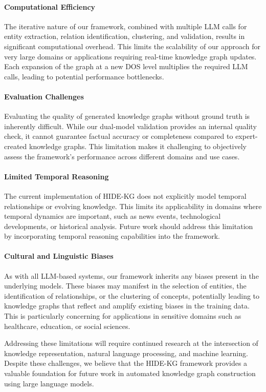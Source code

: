 \documentclass[11pt]{article}
\begin{document}
\paragraph{Computational Efficiency} The iterative nature of our framework, combined with multiple LLM calls for entity extraction, relation identification, clustering, and validation, results in significant computational overhead. This limits the scalability of our approach for very large domains or applications requiring real-time knowledge graph updates. Each expansion of the graph at a new DOS level multiplies the required LLM calls, leading to potential performance bottlenecks.

\paragraph{Evaluation Challenges} Evaluating the quality of generated knowledge graphs without ground truth is inherently difficult. While our dual-model validation provides an internal quality check, it cannot guarantee factual accuracy or completeness compared to expert-created knowledge graphs. This limitation makes it challenging to objectively assess the framework's performance across different domains and use cases.

\paragraph{Limited Temporal Reasoning} The current implementation of HIDE-KG does not explicitly model temporal relationships or evolving knowledge. This limits its applicability in domains where temporal dynamics are important, such as news events, technological developments, or historical analysis. Future work should address this limitation by incorporating temporal reasoning capabilities into the framework.

\paragraph{Cultural and Linguistic Biases} As with all LLM-based systems, our framework inherits any biases present in the underlying models. These biases may manifest in the selection of entities, the identification of relationships, or the clustering of concepts, potentially leading to knowledge graphs that reflect and amplify existing biases in the training data. This is particularly concerning for applications in sensitive domains such as healthcare, education, or social sciences.

Addressing these limitations will require continued research at the intersection of knowledge representation, natural language processing, and machine learning. Despite these challenges, we believe that the HIDE-KG framework provides a valuable foundation for future work in automated knowledge graph construction using large language models.


\end{document}

